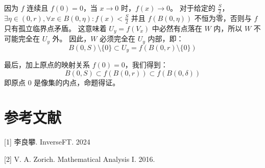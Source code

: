 \documentclass[12pt,a4paper]{ctexart}
\begin{document}
因为 $f$ 连续且 $f(0) = 0$，当 $x \to 0$ 时，$f(x) \to 0$。  
对于给定的 $\frac{S}{2}$，$\exists \eta \in (0,r),\forall x \in B(0,\eta):f(x) < \frac{S}{2}$
并且 $f(B(0,\eta))$ 不恒为零，否则与 $f$ 只有孤立临界点矛盾。  
这意味着 $U_y = f(V_x)$ 中必然有点落在 $W$ 内，所以 $W$ 不可能完全在 $U_y$ 外。
因此，$W$ 必须完全在 $U_y$ 内部，即：
\[
B(0, S) \setminus \{0\} \subset U_y = f(B(0, r) \setminus \{0\})
\]

最后，加上原点的映射关系 $f(0) = 0$，我们得到：
\[
B(0, S) \subset f(B(0, r)) \subset f(B(0, \delta))
\]
即原点 0 是像集的内点，命题得证。 

\section*{参考文献}
[1] 李良攀. InverseFT. 2024

[2] V. A. Zorich. Mathematical Analysis I.  2016.
\end{document}
